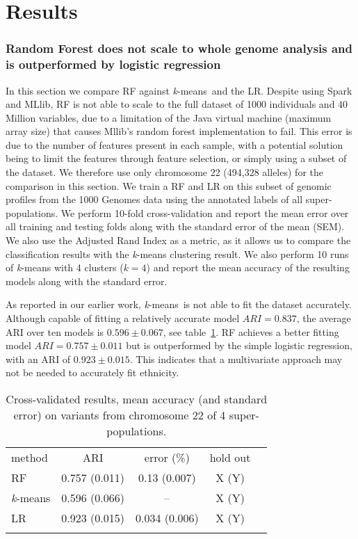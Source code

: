 \documentclass{llncs}
\newcommand{\kMeans}{\textit{k}-means}
\begin{document}
{\section{Results}

\subsubsection{Random Forest does not scale to whole genome analysis and is outperformed by logistic regression}
In this section we compare RF against \kMeans\ and the LR.  
Despite using {\sc Spark} and {\sc MLlib}, RF is not able to scale to the full dataset of 1000 individuals and 40
Million variables, due to a limitation of the Java virtual machine (maximum array size) that causes {\sc Mllib}'s
random forest implementation to fail. This error is due to the number of features present in each sample,
with a potential solution being to limit the features through feature selection, or simply using a subset of the dataset.
We therefore use only chromosome 22 (494,328 alleles) for the comparison in this section.  We train a RF
and LR on this subset of genomic profiles from the 1000 Genomes data using the annotated labels of all
super-populations.  We perform 10-fold cross-validation and report the mean error over all training and testing folds
along with the standard error of the mean (SEM). We also use the Adjusted Rand Index as a metric, as it allows us to
compare the classification results with the \kMeans{} clustering result. We also perform 10 runs of \kMeans{} with 4 clusters (\(k=4\)) and report the mean accuracy of the
resulting models along with the standard error.

As reported in our earlier work, \kMeans\ is not able to fit the dataset accurately.
Although capable of fitting a relatively accurate model \(ARI=0.837\), the average ARI over ten models is  \(0.596 \pm 0.067\), see table~\ref{RF}.
RF achieves a better fitting model \(ARI = 0.757 \pm 0.011\) but is outperformed by the simple logistic regression, with an ARI of \(0.923 \pm 0.015\).
This indicates that a multivariate approach may not be needed to accurately fit ethnicity. 


\begin{table}
\caption{Cross-validated results, mean accuracy (and standard error) on variants from chromosome 22 of 4 super-populations.}
\begin{center}
\renewcommand{\arraystretch}{1.4}
\setlength\tabcolsep{3pt}
\begin{tabular}{lcccc}
\hline\noalign{\smallskip}
method  & ARI & error (\%) & hold out \\
RF  & 0.757 (0.011) &0.13 (0.007) & X (Y) \\
\kMeans & 0.596 (0.066) & -- & X (Y) \\
LR & 0.923 (0.015) & 0.034 (0.006) & X (Y) \\
\noalign{\smallskip}
\hline
\label{RF}
\end{tabular}
\end{center}
\end{table}

}
\end{document}
